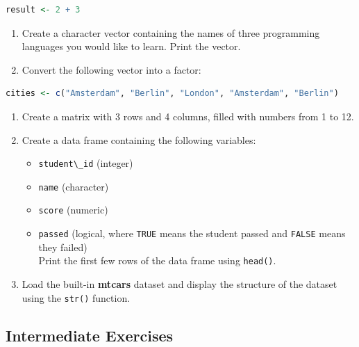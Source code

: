 \documentclass[
]{book}
\newcommand{\passthrough}[1]{#1}
\providecommand{\tightlist}{%
  \setlength{\itemsep}{0pt}\setlength{\parskip}{0pt}}
\theoremstyle{definition}
\theoremstyle{definition}
\theoremstyle{definition}
\theoremstyle{definition}
\theoremstyle{remark}
\begin{document}
\begin{lstlisting}[language=R]
result <- 2 + 3
\end{lstlisting}

\begin{enumerate}
\def\labelenumi{\arabic{enumi}.}
\setcounter{enumi}{5}
\tightlist
\item
  Create a character vector containing the names of three programming languages you would like to learn. Print the vector.\\
\item
  Convert the following vector into a factor:
\end{enumerate}

\begin{lstlisting}[language=R]
cities <- c("Amsterdam", "Berlin", "London", "Amsterdam", "Berlin")
\end{lstlisting}

\begin{enumerate}
\def\labelenumi{\arabic{enumi}.}
\setcounter{enumi}{7}
\tightlist
\item
  Create a matrix with 3 rows and 4 columns, filled with numbers from 1 to 12.\\
\item
  Create a data frame containing the following variables:

  \begin{itemize}
  \tightlist
  \item
    \passthrough{\lstinline!student\_id!} (integer)\\
  \item
    \passthrough{\lstinline!name!} (character)\\
  \item
    \passthrough{\lstinline!score!} (numeric)\\
  \item
    \passthrough{\lstinline!passed!} (logical, where \passthrough{\lstinline!TRUE!} means the student passed and \passthrough{\lstinline!FALSE!} means they failed)\\
    Print the first few rows of the data frame using \passthrough{\lstinline!head()!}.\\
  \end{itemize}
\item
  Load the built-in \textbf{mtcars} dataset and display the structure of the dataset using the \passthrough{\lstinline!str()!} function.
\end{enumerate}

\subsection*{Intermediate Exercises}\label{intermediate-exercises}
\end{document}
